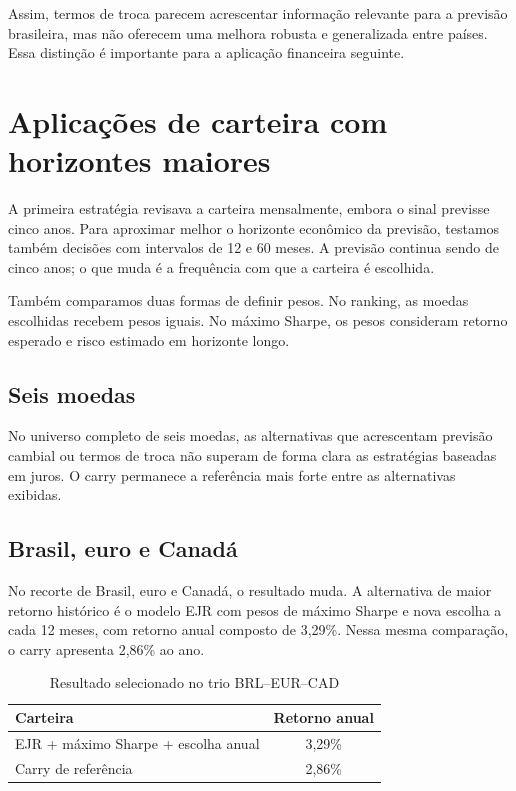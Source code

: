 \documentclass[11pt,a4paper]{article}
\begin{document}
Assim, termos de troca parecem acrescentar informação relevante para a previsão brasileira, mas não oferecem uma melhora robusta e generalizada entre países. Essa distinção é importante para a aplicação financeira seguinte.

\section{Aplicações de carteira com horizontes maiores}

A primeira estratégia revisava a carteira mensalmente, embora o sinal previsse cinco anos. Para aproximar melhor o horizonte econômico da previsão, testamos também decisões com intervalos de 12 e 60 meses. A previsão continua sendo de cinco anos; o que muda é a frequência com que a carteira é escolhida.

Também comparamos duas formas de definir pesos. No ranking, as moedas escolhidas recebem pesos iguais. No máximo Sharpe, os pesos consideram retorno esperado e risco estimado em horizonte longo.

\subsection{Seis moedas}

No universo completo de seis moedas, as alternativas que acrescentam previsão cambial ou termos de troca não superam de forma clara as estratégias baseadas em juros. O carry permanece a referência mais forte entre as alternativas exibidas.

\subsection{Brasil, euro e Canadá}

No recorte de Brasil, euro e Canadá, o resultado muda. A alternativa de maior retorno histórico é o modelo EJR com pesos de máximo Sharpe e nova escolha a cada 12 meses, com retorno anual composto de 3,29\%. Nessa mesma comparação, o carry apresenta 2,86\% ao ano.

\begin{table}[htbp]
\centering
\caption{Resultado selecionado no trio BRL--EUR--CAD}
\begin{tabular}{lc}
\toprule
\textbf{Carteira} & \textbf{Retorno anual} \\
\midrule
EJR + máximo Sharpe + escolha anual & 3,29\% \\
Carry de referência & 2,86\% \\
\bottomrule
\end{tabular}
\end{table}
\end{document}
